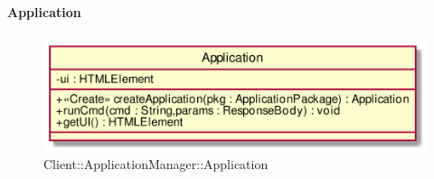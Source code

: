\hypertarget{Application_label}{\paragraph{Application}}
\begin{figure}[h]
	\centering
	\includegraphics[width=\textwidth,height=\textheight,keepaspectratio]{images/ClassApplication.png}
	\caption{Client::ApplicationManager::Application}
\end{figure}
